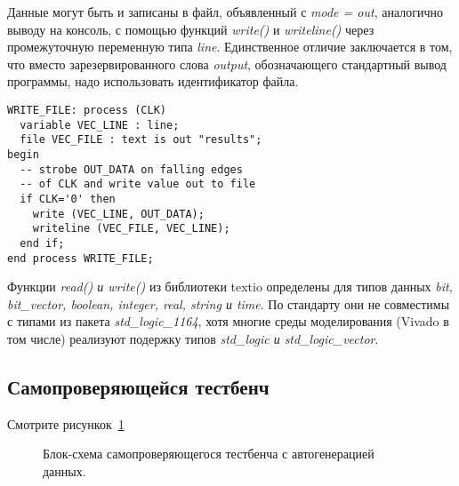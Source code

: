 Данные могут быть и записаны в файл, объявленный с \emph{mode = out}, аналогично выводу на консоль, с помощью функций \emph{write()} и \emph{writeline()} через промежуточную переменную типа \emph{line}. Единственное отличие заключается в том, что вместо зарезервированного слова \emph{output}, обозначающего стандартный вывод программы, надо использовать идентификатор файла.

\begin{Code}
\begin{lstlisting}
WRITE_FILE: process (CLK)
  variable VEC_LINE : line;
  file VEC_FILE : text is out "results";
begin
  -- strobe OUT_DATA on falling edges
  -- of CLK and write value out to file
  if CLK='0' then
    write (VEC_LINE, OUT_DATA);
    writeline (VEC_FILE, VEC_LINE);
  end if;
end process WRITE_FILE;
\end{lstlisting}
\end{Code}

Функции \emph{read() и write()} из библиотеки textio определены для типов данных \emph{bit, bit\_vector, boolean, integer, real, string и time}. По стандарту они не совместимы с типами из пакета \emph{std\_logic\_1164}, хотя многие среды моделирования (Vivado в том числе) реализуют подержку типов \emph{std\_logic и std\_logic\_vector}.


\subsection{Самопроверяющейся тестбенч}



Смотрите рисункок~\ref{tb_1}

\begin{figure}[ht]
\centering
{}
\caption{Блок-схема самопроверяющегося тестбенча с автогенерацией данных.}
\label{tb_1}
\end{figure}


